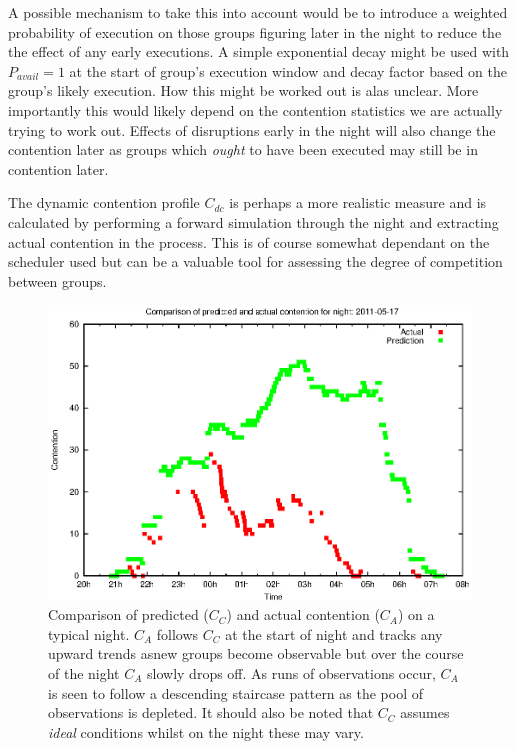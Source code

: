 A possible mechanism to take this into account would be to introduce a weighted probability of execution on those groups figuring later in the night to reduce the the effect of any early executions. A simple exponential decay might be used with $P_{avail}=1$ at the start of group's execution window and decay factor based on the group's likely execution. How this might be worked out is alas unclear. More importantly this would likely depend on the contention statistics we are actually trying to work out. Effects of disruptions early in the night will also change the contention later as groups which \emph{ought} to have been executed may still be in contention later. 

The dynamic contention profile $C_{dc}$ is perhaps a more realistic measure and is calculated by performing a forward simulation through the night and extracting actual contention in the process. This is of course somewhat dependant on the scheduler used but can be a valuable tool for assessing the degree of competition between groups.

\begin{figure}[htbp]  
  \begin{center}
    \includegraphics[scale=0.8, angle=0]{figures/contention_2011-05-17.eps}
  \end{center}
  \caption[ Comparison of predicted and actual contention on a typical night.]
   {Comparison of predicted ($C_C$) and actual contention ($C_A$) on a typical night. $C_A$ follows $C_C$ at the start of night and tracks any upward trends asnew groups become observable but over the course of the night $C_A$ slowly drops off. As runs of observations occur, $C_A$ is seen to follow a descending staircase pattern as the pool of observations is depleted. It should also be noted that $C_C$ assumes \emph{ideal} conditions whilst on the night these may vary.}
  \label{fig:contention_plot}
\end{figure}


